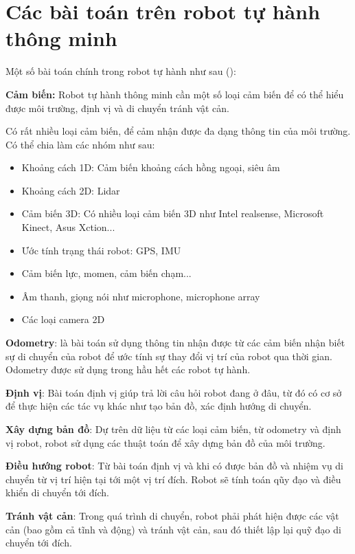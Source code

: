 \section{Các bài toán trên robot tự hành thông minh}

Một số bài toán chính trong robot tự hành như sau (\cite{Wise}):

\textbf{Cảm biến:} Robot tự hành thông minh cần một số loại cảm biến để có thể hiểu được môi trường, định vị và di chuyển tránh vật cản. 

Có rất nhiều loại cảm biến, để cảm nhận được đa dạng thông tin của môi trường. Có thể chia làm các nhóm như sau:
\begin{itemize}
\item Khoảng cách 1D: Cảm biến khoảng cách hồng ngoại, siêu âm
\item Khoảng cách 2D: Lidar
\item Cảm biến 3D: Có nhiều loại cảm biến 3D như Intel realsense, Microsoft Kinect, Asus Xction...
\item Ước tính trạng thái robot: GPS, IMU
\item Cảm biến lực, momen, cảm biến chạm...
\item Âm thanh, giọng nói như microphone, microphone array
\item Các loại camera 2D
\end{itemize}

\textbf{Odometry}: là bài toán sử dụng thông tin nhận được từ các cảm biến nhận biết sự di chuyển của robot để ước tính sự thay đổi vị trí của robot qua thời gian. Odometry được sử dụng trong hầu hết các robot tự hành.

\textbf{Định vị}: Bài toán định vị giúp trả lời câu hỏi robot đang ở đâu, từ đó có cơ sở để thực hiện các tác vụ khác như tạo bản đồ, xác định hướng di chuyển.

\textbf{Xây dựng bản đồ}: Dự trên dữ liệu từ các loại cảm biến, từ odometry và định vị robot, robot sử dụng các thuật toán để xây dựng bản đồ của môi trường.

\textbf{Điều hướng robot}: Từ bài toán định vị và khi có được bản đồ và nhiệm vụ di chuyển từ vị trí hiện tại tới một vị trí đích. Robot sẽ tính toán qũy đạo và điều khiển di chuyển tới đích.

\textbf{Tránh vật cản}: Trong quá trình di chuyển, robot phải phát hiện được các vật cản (bao gồm cả tĩnh và động) và tránh vật cản, sau đó thiết lập lại quỹ đạo di chuyển tới đích.

